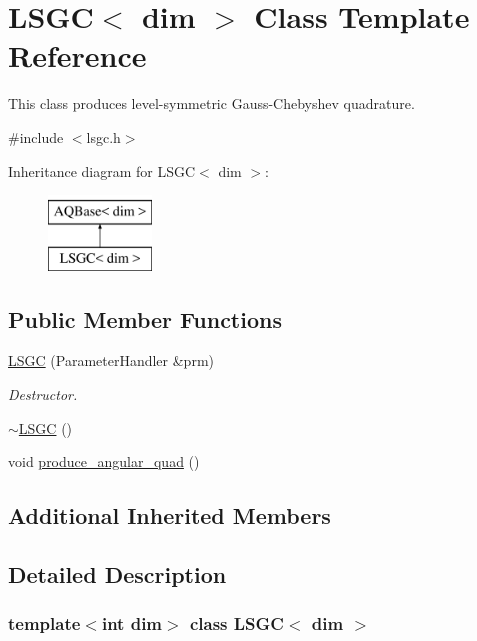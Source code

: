 \hypertarget{class_l_s_g_c}{}\section{L\+S\+GC$<$ dim $>$ Class Template Reference}
\label{class_l_s_g_c}


This class produces level-\/symmetric Gauss-\/\+Chebyshev quadrature.  




{\ttfamily \#include $<$lsgc.\+h$>$}

Inheritance diagram for L\+S\+GC$<$ dim $>$\+:\begin{figure}[H]
\begin{center}
\leavevmode
\includegraphics[height=2.000000cm]{class_l_s_g_c}
\end{center}
\end{figure}
\subsection*{Public Member Functions}
\begin{DoxyCompactItemize}
\item 
\hyperlink{class_l_s_g_c_a9b89f615563bd3583a4a6a36d7b3eb7d}{L\+S\+GC} (Parameter\+Handler \&prm)
\begin{DoxyCompactList}\small\item\em Destructor. \end{DoxyCompactList}\item 
\hyperlink{class_l_s_g_c_abcba8afdb075485278288db321776b7e}{$\sim$\+L\+S\+GC} ()
\item 
void \hyperlink{class_l_s_g_c_a1d135fb9ca12a9b65b8cc397479fc4d7}{produce\+\_\+angular\+\_\+quad} ()
\end{DoxyCompactItemize}
\subsection*{Additional Inherited Members}


\subsection{Detailed Description}
\subsubsection*{template$<$int dim$>$\newline
class L\+S\+G\+C$<$ dim $>$}

